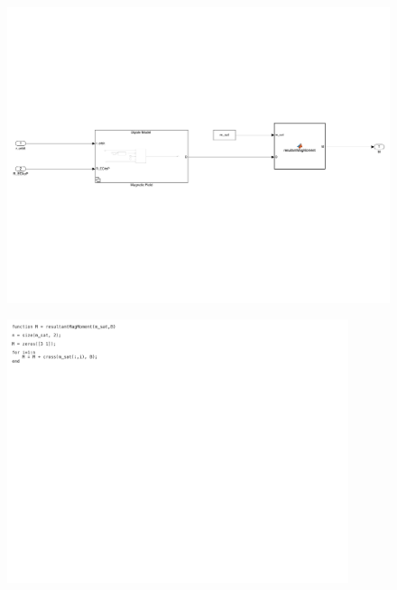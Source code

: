 \begin{figure}[H]
    \centering
    \includegraphics[trim={0.25cm 6cm 0.25cm 6cm},clip,width = 15cm]{Images/PS5/magneticField-1.png}
\end{figure}

\begin{figure}[H]
    \centering
    \includegraphics[trim={0cm 18cm 18cm 0cm},clip,width = 10cm]{Images/PS5/magneticField-2.png}
\end{figure}

